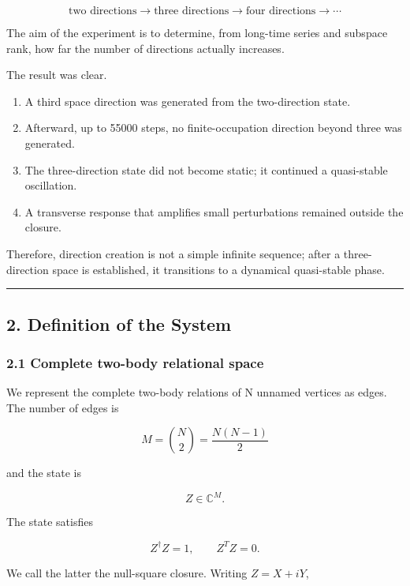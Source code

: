 \documentclass[
  a4paper,
]{article}
\providecommand{\tightlist}{%
  \setlength{\itemsep}{0pt}\setlength{\parskip}{0pt}}
\begin{document}
\[
\text{two directions}
\longrightarrow
\text{three directions}
\longrightarrow
\text{four directions}
\longrightarrow\cdots
\]

The aim of the experiment is to determine, from long-time series and
subspace rank, how far the number of directions actually increases.

The result was clear.

\begin{enumerate}
\def\labelenumi{\arabic{enumi}.}
\tightlist
\item
  A third space direction was generated from the two-direction state.
\item
  Afterward, up to 55000 steps, no finite-occupation direction beyond
  three was generated.
\item
  The three-direction state did not become static; it continued a
  quasi-stable oscillation.
\item
  A transverse response that amplifies small perturbations remained
  outside the closure.
\end{enumerate}

Therefore, direction creation is not a simple infinite sequence; after a
three-direction space is established, it transitions to a dynamical
quasi-stable phase.

\begin{center}\rule{0.5\linewidth}{0.5pt}\end{center}

\subsection{2. Definition of the System}\label{definition-of-the-system}

\subsubsection{2.1 Complete two-body relational
space}\label{complete-two-body-relational-space}

We represent the complete two-body relations of N unnamed vertices as
edges. The number of edges is

\[
M=\binom{N}{2}=\frac{N(N-1)}{2}
\]

and the state is

\[
Z\in\mathbb C^M .
\]

The state satisfies

\[
Z^\dagger Z=1,
\qquad
Z^T Z=0 .
\]

We call the latter the null-square closure. Writing \(Z=X+iY\),
\end{document}
